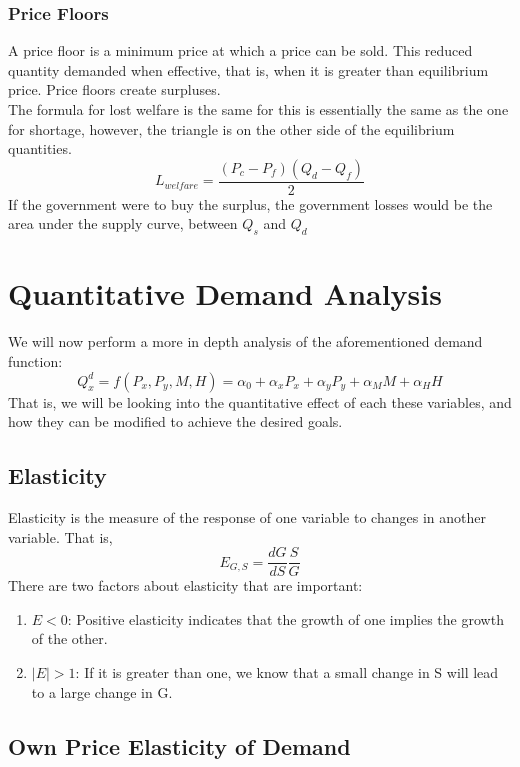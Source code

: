 \documentclass[nobib]{article}
\begin{document}
\subsubsection{Price Floors}
A price floor is a minimum price at which a price can be sold. This reduced
quantity demanded when effective, that is, when it is greater than equilibrium
price. Price floors create surpluses.\\ The formula for lost welfare is the
same for this is essentially the same as the one for shortage, however, the
triangle is on the other side of the equilibrium quantities.\\
\begin{equation*}
    L_{welfare} =\frac{(P_c-P_f)(Q_d-Q_f)}{2}
\end{equation*}
If the government were to buy the surplus, the government losses would be the area under the supply curve, between $Q_s$ and $Q_d$
\section{Quantitative Demand Analysis}
We will now perform a more in depth analysis of the aforementioned demand function:
\begin{equation*}
    Q_x^d = f(P_x,P_y,M,H) = \alpha_0 + \alpha_x P_x + \alpha_y P_y +\alpha_M M+ \alpha_H H
\end{equation*}
That is, we will be looking into the quantitative effect of each these variables, and how they can be modified to achieve the desired goals.\\
\subsection{Elasticity}
Elasticity is the measure of the response of one variable to changes in another variable. That is,
\begin{equation*}
    E_{G,S} = \frac{dG}{dS} \frac{S}{G}
\end{equation*}
There are two factors about elasticity that are important:
\begin{enumerate}
    \item $E < 0$: Positive elasticity indicates that the growth of one implies the growth of the other. 
    \item $|E|>1$: If it is greater than one, we know that a small change in S will lead to a large change in G.
\end{enumerate}
\subsection{Own Price Elasticity of Demand}
\end{document}
